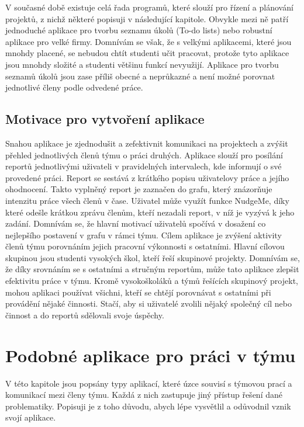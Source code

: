 V současné době existuje celá řada programů, které slouží pro řízení a plánování projektů, z nichž některé popisuji v následující kapitole. Obvykle mezi ně patří jednoduché aplikace pro tvorbu seznamu úkolů (To-do lists) nebo robustní aplikace pro velké firmy. Domnívám se však, že s velkými aplikacemi, které jsou mnohdy placené, se nebudou chtít studenti učit pracovat, protože tyto aplikace jsou mnohdy složité a studenti většinu funkcí nevyužijí. Aplikace pro tvorbu seznamů úkolů jsou zase příliš obecné a neprůkazné a není možné porovnat jednotlivé členy podle odvedené práce. 

\section{Motivace pro vytvoření aplikace}

Snahou aplikace je zjednodušit a zefektivnit komunikaci na projektech a zvýšit přehled jednotlivých členů týmu o práci druhých. Aplikace slouží pro posílání reportů jednotlivými uživateli v pravidelných intervalech, kde informují o své provedené práci. Report se sestává z krátkého popisu uživatelovy práce a jejího ohodnocení. Takto vyplněný report je zaznačen do grafu, který znázorňuje intenzitu práce všech členů v čase. Uživatel může využít funkce NudgeMe, díky které odešle krátkou zprávu členům, kteří nezadali report, v níž je vyzývá k jeho zadání. Domnívám se, že hlavní motivací uživatelů spočívá v dosažení co nejlepšího postavení v grafu v rámci týmu. Cílem aplikace je zvýšení aktivity členů týmu porovnáním jejich pracovní výkonnosti s ostatními. Hlavní cílovou skupinou jsou studenti vysokých škol, kteří řeší skupinové projekty. Domnívám se, že díky srovnáním se s ostatními a stručným reportům, může tato aplikace zlepšit efektivitu práce v týmu. Kromě vysokoškoláků a týmů řešících skupinový projekt, mohou aplikaci používat všichni, kteří se chtějí porovnávat s ostatními při provádění nějaké činnosti. Stačí, aby si uživatelé zvolili nějaký společný cíl nebo činnost a do reportů sdělovali svoje úspěchy. 

\chapter{Podobné aplikace pro práci v týmu} \label{apps}

V této kapitole jsou popsány typy aplikací, které úzce souvisí s týmovou prací a komunikací mezi členy týmu. Každá z nich zastupuje jiný přístup řešení dané problematiky. Popisuji je z toho důvodu, abych lépe vysvětlil a odůvodnil vznik svojí aplikace.

